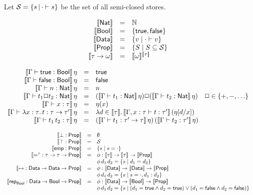 \documentclass[12pt,a4paper]{article}
\begin{document}
Let $\mathcal{S} = \{s\,|\,{\cdot}\vdash{s}\}$ be the set of all semi-closed stores.
\begin{definition}
  \[\begin{array}{rcl}
    \llbracket\mathsf{Nat}\rrbracket &=& \mathbb N \\
    \llbracket\mathsf{Bool}\rrbracket &=& \{\mathsf{true},\mathsf{false}\} \\
    \llbracket\mathsf{Data}\rrbracket &=& \{v \mid {\cdot}\vdash{v}\} \\
    \llbracket\mathsf{Prop}\rrbracket &=& \{S \mid S \subseteq \mathcal{S}\} \\
    \llbracket\tau \to \omega\rrbracket &=& \llbracket\omega\rrbracket^{\llbracket\tau\rrbracket} \\
  \end{array}\]
\end{definition}

{\footnotesize
  \[\begin{array}{rcl}
    \llbracket{\Gamma}\vdash{\ensuremath{\mathsf{true}}}:{\mathsf{Bool}}\rrbracket\,\eta &=& \mathsf{true} \\
    \llbracket{\Gamma}\vdash{\ensuremath{\mathsf{false}}}:{\mathsf{Bool}}\rrbracket\,\eta &=& \mathsf{false} \\
    \llbracket{\Gamma}\vdash{n}:{\mathsf{Nat}}\rrbracket\,\eta &=& n \\
    \llbracket{\Gamma}\vdash{t_1 \Box t_2}:{\mathsf{Nat}}\rrbracket\,\eta &=& (\llbracket{\Gamma}\vdash{t_1}:{\mathsf{Nat}}\rrbracket\,\eta) \Box (\llbracket{\Gamma}\vdash{t_2}:{\mathsf{Nat}}\rrbracket\,\eta) \quad \Box\in\{+,-,\ldots\} \\
    \llbracket{\Gamma}\vdash{x}:{\tau}\rrbracket\,\eta &=& \eta(x) \\
    \llbracket{\Gamma}\vdash{\lambda{x:\tau}.\,{t}}:{\tau \to \tau'}\rrbracket\,\eta &=& \lambda{d\in\ensuremath{\llbracket\tau\rrbracket}}.\,{\llbracket{\Gamma,x:\tau}\vdash{t}:{\tau'}\rrbracket\,(\eta[d/x])} \\
    \llbracket{\Gamma}\vdash{{t_1}\,{t_2}}:{\tau}\rrbracket\,\eta &=& {(\llbracket{\Gamma}\vdash{t_1}:{\tau' \to \tau}\rrbracket\,\eta)}\,{(\llbracket{\Gamma}\vdash{t_2}:{\tau'}\rrbracket\,\eta)} \\
  \end{array}\]
  
  \[\begin{array}{rcl}
    \llbracket{\bot}:{\mathsf{Prop}}\rrbracket &=& \emptyset \\
    \llbracket{\top}:{\mathsf{Prop}}\rrbracket &=& \mathcal{S} \\
    \llbracket{\ensuremath{\mathsf{emp}}}:{\mathsf{Prop}}\rrbracket &=& \{s \mid s = \cdot\} \\
    \llbracket{=^\tau}:{\tau \to \tau \to \mathsf{Prop}}\rrbracket &=& \phi:\llbracket\tau\rrbracket \to \llbracket\tau\rrbracket\to\llbracket\mathsf{Prop}\rrbracket \\
    && \phi\,d_1\,d_2 = \{s \mid d_1 = d_2\} \\
    \llbracket{\mapsto}:{\mathsf{Data} \to \mathsf{Data} \to \mathsf{Prop}}\rrbracket &=& \phi:\llbracket\mathsf{Data}\rrbracket\to\llbracket\mathsf{Data}\rrbracket\to\llbracket\mathsf{Prop}\rrbracket \\
    && \phi\,d_1\,d_2 = \{s \mid s = \cdot,d_1:d_2\} \\
    \llbracket{\ensuremath{\mathsf{rep}}_{\ensuremath{\mathsf{Bool}}}}:{\mathsf{Data} \to \mathsf{Bool} \to \mathsf{Prop}}\rrbracket &=& \phi:\llbracket\mathsf{Data}\rrbracket\to\llbracket\mathsf{Bool}\rrbracket\to\llbracket\mathsf{Prop}\rrbracket \\
    && \phi\,d_1\,d_2 = \{s \mid (d_1 = \mathsf{true} \wedge d_2 = \mathsf{true}) \vee (d_1 = \mathsf{false} \wedge d_2 = \mathsf{false}) \} \\
  \end{array}\]
  
}
\end{document}
